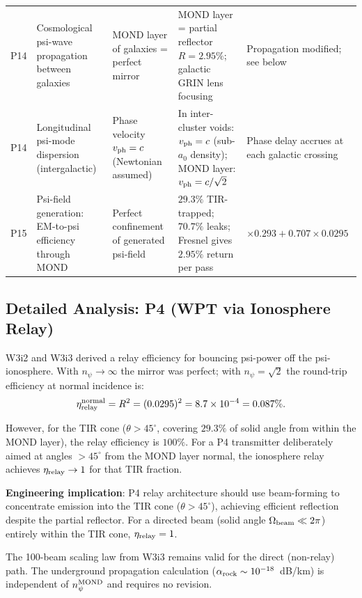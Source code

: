 \documentclass[aps,prd,twocolumn,superscriptaddress]{revtex4-2}
\newcommand{\npsi}{n_\psi}
\newcommand{\ee}[1]{\times 10^{#1}}
\begin{document}
\begin{table}[ht]
\begin{tabular}{p{0.5cm} p{2.5cm} p{4cm} p{3.5cm} p{2cm}}
P14 & Cosmological psi-wave propagation between galaxies & MOND layer of galaxies = perfect mirror & MOND layer = partial reflector $R = 2.95\%$; galactic GRIN lens focusing & Propagation modified; see below \\[2pt]
P14 & Longitudinal psi-mode dispersion (intergalactic) & Phase velocity $v_{\rm ph} = c$ (Newtonian assumed) & In inter-cluster voids: $v_{\rm ph} = c$ (sub-$a_0$ density); MOND layer: $v_{\rm ph} = c/\sqrt{2}$ & Phase delay accrues at each galactic crossing \\[2pt]
P15 & Psi-field generation: EM-to-psi efficiency through MOND & Perfect confinement of generated psi-field & $29.3\%$ TIR-trapped; $70.7\%$ leaks; Fresnel gives $2.95\%$ return per pass & $\times 0.293 + 0.707 \times 0.0295$ \\[2pt]
\bottomrule
\end{tabular}
\end{table}

\subsection{Detailed Analysis: P4 (WPT via Ionosphere Relay)}
\label{subsec:P4}

W3i2 and W3i3 derived a relay efficiency for bouncing psi-power off
the psi-ionosphere.  With $\npsi \to \infty$ the mirror was perfect;
with $\npsi = \sqrt{2}$ the round-trip efficiency at normal incidence is:
\begin{equation}
\eta_{\rm relay}^{\rm normal} = R^2 = (0.0295)^2 = 8.7\ee{-4} = 0.087\%.
\end{equation}

However, for the TIR cone ($\theta > 45^\circ$, covering $29.3\%$ of
solid angle from within the MOND layer), the relay efficiency is $100\%$.
For a P4 transmitter deliberately aimed at angles $> 45^\circ$ from the
MOND layer normal, the ionosphere relay achieves $\eta_{\rm relay} \to 1$
for that TIR fraction.

\textbf{Engineering implication}: P4 relay architecture should use
beam-forming to concentrate emission into the TIR cone
($\theta > 45^\circ$), achieving efficient reflection despite the
partial reflector.  For a directed beam (solid angle
$\Omega_{\rm beam} \ll 2\pi$) entirely within the TIR cone,
$\eta_{\rm relay} = 1$.

The 100-beam scaling law from W3i3 remains valid for the direct
(non-relay) path.  The underground propagation calculation
($\alpha_{\rm rock} \sim 10^{-18}$~dB/km) is independent of
$\npsi^{\rm MOND}$ and requires no revision.
\end{document}

